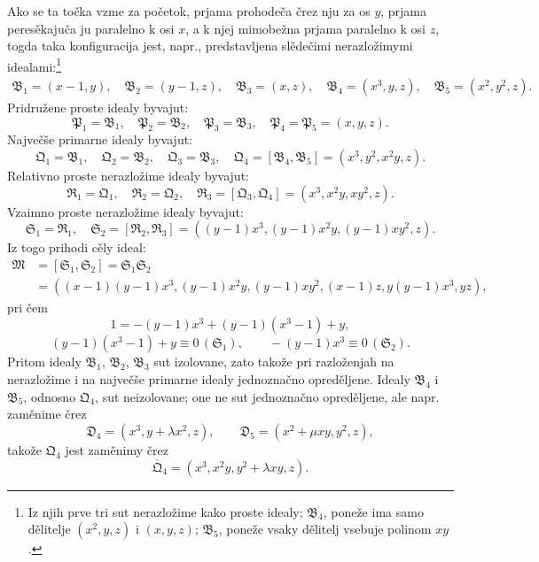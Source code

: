\documentclass[11pt]{article}
\newcommand{\ideal}[1]{\mathfrak{#1}}
\newcommand{\eqzero}[1]{\equiv 0\,(#1)}
\begin{document}
Ako se ta točka vzme za početok, prjama prohodeča črez nju za os \(y\), prjama peresěkajuča ju paralelno k osi \(x\), a k njej mimobežna prjama paralelno k osi \(z\), togda taka konfiguracija jest, napr., predstavljena slědečimi nerazložimymi idealami:\footnote{Iz njih prve tri sut nerazložime kako proste idealy; \(\ideal B_4\), poneže ima samo dělitelje \((x^2,y,z)\) i \((x,y,z)\); \(\ideal B_5\), poneže vsaky dělitelj vsebuje polinom \(xy\).}
\[
\begin{gathered}
 \ideal B_1=(x-1,y),\quad
 \ideal B_2=(y-1,z),\quad
 \ideal B_3=(x,z),\quad
 \ideal B_4=(x^3,y,z),\quad
 \ideal B_5=(x^2,y^2,z).
\end{gathered}
\]
Pridružene proste idealy byvajut:
\[
 \ideal P_1=\ideal B_1,
 \quad \ideal P_2=\ideal B_2,
 \quad \ideal P_3=\ideal B_3,
 \quad \ideal P_4=\ideal P_5=(x,y,z).
\]
Največše primarne idealy byvajut:
\[
 \ideal Q_1=\ideal B_1,
 \quad \ideal Q_2=\ideal B_2,
 \quad \ideal Q_3=\ideal B_3,
 \quad \ideal Q_4=[\ideal B_4,\ideal B_5]=(x^3,y^2,x^2y,z).
\]
Relativno proste nerazložime idealy byvajut:
\[
 \ideal R_1=\ideal Q_1,
 \quad \ideal R_2=\ideal Q_2,
 \quad \ideal R_3=[\ideal Q_3,\ideal Q_4]=(x^3,x^2y,xy^2,z).
\]
Vzaimno proste nerazložime idealy byvajut:
\[
 \ideal S_1=\ideal R_1,
 \quad
 \ideal S_2=[\ideal R_2,\ideal R_3]=((y-1)x^3,(y-1)x^2y,(y-1)xy^2,z).
\]
Iz togo prihodi cěly ideal:
\[
\begin{aligned}
 \ideal M&=[\ideal S_1,\ideal S_2]=\ideal S_1\ideal S_2 \\
 &=((x-1)(y-1)x^3,(y-1)x^2y,(y-1)xy^2,(x-1)z,y(y-1)x^3,yz),
\end{aligned}
\]
pri čem
\[
 1=-(y-1)x^3+(y-1)(x^3-1)+y,
\]
\[
 (y-1)(x^3-1)+y\eqzero{\ideal S_1},
 \qquad -(y-1)x^3\eqzero{\ideal S_2}.
\]
Pritom idealy \(\ideal B_1\), \(\ideal B_2\), \(\ideal B_3\) sut izolovane, zato takože pri razloženjah na nerazložime i na največše primarne idealy jednoznačno opreděljene. Idealy \(\ideal B_4\) i \(\ideal B_5\), odnosno \(\ideal Q_4\), sut neizolovane; one ne sut jednoznačno opreděljene, ale napr. zaměnime črez
\[
 \ideal D_4=(x^3,y+\lambda x^2,z),
 \qquad
 \ideal D_5=(x^2+\mu xy,y^2,z),
\]
takože \(\ideal Q_4\) jest zaměnimy črez
\[
 \overline{\ideal Q}_4=(x^3,x^2y,y^2+\lambda xy,z).
\]
\end{document}
